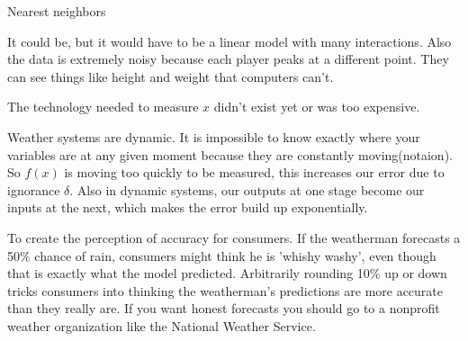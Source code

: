 \documentclass[12pt]{article}
\begin{document}

\begin{enumerate}

Nearest neighbors

It could be, but it would have to be a linear model with many interactions. Also the data is extremely noisy because each player peaks at a different point.
They can see things like height and weight that computers can't.

The technology needed to measure $x$ didn't exist yet or was too expensive.


Weather systems are dynamic. It is impossible to know exactly where your variables are at any given moment because they are constantly moving(notaion). So $f(x)$ is moving too quickly to be measured, this increases our error due to ignorance $\delta$. Also in dynamic systems, our outputs at one stage become our inputs at the next, which makes the error build up exponentially.


To create the perception of accuracy for consumers. If the weatherman forecasts a 50$\%$ chance of rain, consumers might think he is 'whishy washy', even though that is exactly what the model predicted. Arbitrarily rounding 10$\%$ up or down tricks consumers into thinking the weatherman's predictions are more accurate than they really are. If you want honest forecasts you should go to a nonprofit weather organization like the National Weather Service.


\end{enumerate}
\end{document}
